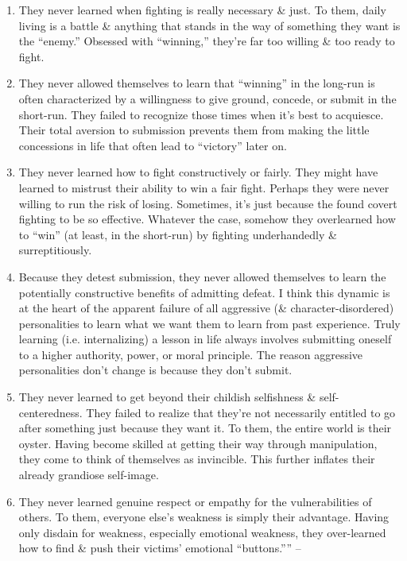 \documentclass{article}
\numberwithin{equation}{section}
\begin{document}
\begin{enumerate}
	\item They never learned when fighting is really necessary \& just. To them, daily living is a battle \& anything that stands in the way of something they want is the ``enemy.'' Obsessed with ``winning,'' they're far too willing \& too ready to fight.
	\item They never allowed themselves to learn that ``winning'' in the long-run is often characterized by a willingness to give ground, concede, or submit in the short-run. They failed to recognize those times when it's best to acquiesce. Their total aversion to submission prevents them from making the little concessions in life that often lead to ``victory'' later on.
	\item They never learned how to fight constructively or fairly. They might have learned to mistrust their ability to win a fair fight. Perhaps they were never willing to run the risk of losing. Sometimes, it's just because the found covert fighting to be so effective. Whatever the case, somehow they overlearned how to ``win'' (at least, in the short-run) by fighting underhandedly \& surreptitiously.
	\item Because they detest submission, they never allowed themselves to learn the potentially constructive benefits of admitting defeat. I think this dynamic is at the heart of the apparent failure of all aggressive (\& character-disordered) personalities to learn what we want them to learn from past experience. Truly learning (i.e. internalizing) a lesson in life always involves submitting oneself to a higher authority, power, or moral principle. The reason aggressive personalities don't change is because they don't submit.
	\item They never learned to get beyond their childish selfishness \& self-centeredness. They failed to realize that they're not necessarily entitled to go after something just because they want it. To them, the entire world is their oyster. Having become skilled at getting their way through manipulation, they come to think of themselves as invincible. This further inflates their already grandiose self-image.
	\item They never learned genuine respect or empathy for the vulnerabilities of others. To them, everyone else's weakness is simply their advantage. Having only disdain for weakness, especially emotional weakness, they over-learned how to find \& push their victims' emotional ``buttons.'''' -- \cite[pp. 44--46]{Simon2010}
\end{enumerate}
\end{document}

